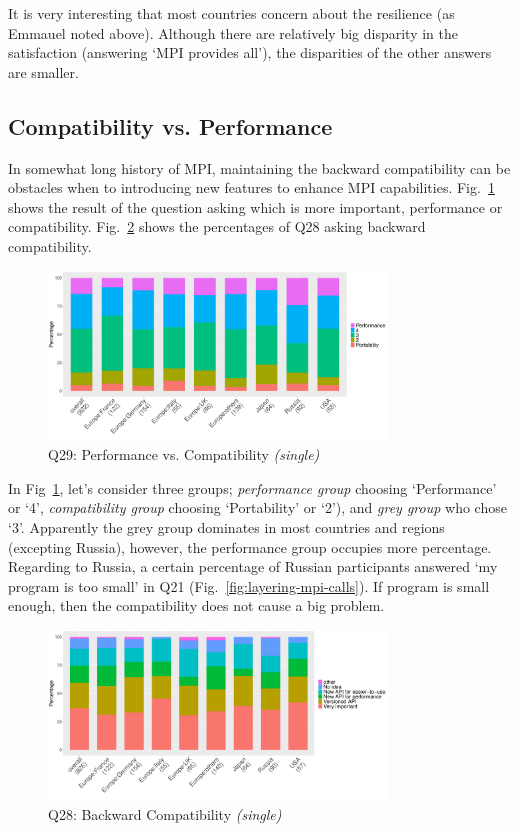 \documentclass[conference,10pt,letterpaper]{IEEEtran}
\def\myquote#1{`#1'}
\begin{document}
It is very interesting that most countries concern about the
resilience (as Emmauel noted above). Although there are relatively big
disparity in the satisfaction (answering \myquote{MPI provides all}),
the disparities of the other answers are smaller. 

\subsection{Compatibility vs. Performance}

In somewhat long history of MPI, maintaining the backward
compatibility can be obstacles when to introducing new features to
enhance MPI capabilities. Fig.~\ref{fig:performance-vs-compatibility} shows the 
result of the question asking which is more important, performance or 
compatibility. Fig.~\ref{fig:compatibility} shows the percentages of
Q28 asking backward compatibility.

\begin{figure}[htb]
\begin{center}
\includegraphics[width=9cm]{R-scripts/Q29.pdf}
\caption{Q29: Performance vs. Compatibility {\it(single)}}
\label{fig:performance-vs-compatibility}
\end{center}
\end{figure}

In Fig~\ref{fig:performance-vs-compatibility}, let's consider three
groups; {\it performance group} choosing \myquote{Performance} or
\myquote{4}, {\it compatibility group} choosing \myquote{Portability} or
\myquote{2}), and {\it grey group} who chose \myquote{3}. Apparently the grey
group dominates in most countries and regions (excepting Russia),
however, the performance group occupies more percentage. Regarding to
Russia, a certain percentage of Russian participants answered
\myquote{my program is too small} in Q21
(Fig.~\ref{fig:layering-mpi-calls}). If program is small enough, then
the compatibility does not cause a big problem.

\begin{figure}[htb]
\begin{center}
\includegraphics[width=9cm]{R-scripts/Q28.pdf}
\caption{Q28: Backward Compatibility {\it(single)}}
\label{fig:compatibility}
\end{center}
\end{figure}
\end{document}
